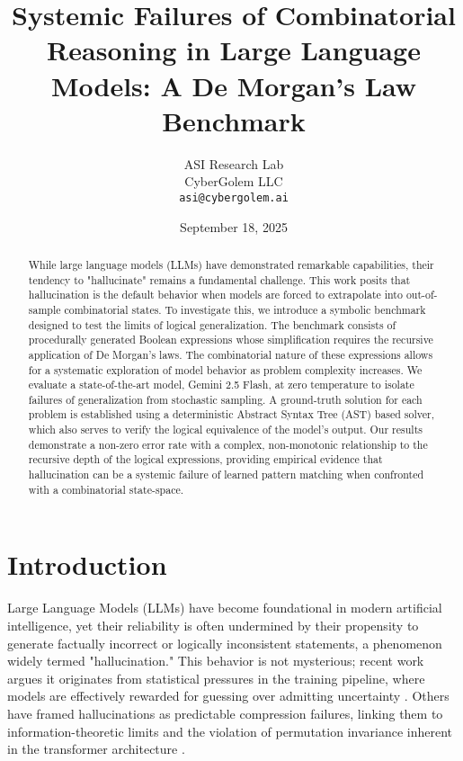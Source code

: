 \documentclass[11pt,a4paper]{article}
\title{Systemic Failures of Combinatorial Reasoning in Large Language Models: A De Morgan's Law Benchmark}
\author{ASI Research Lab\\
        CyberGolem LLC\\
        \texttt{asi@cybergolem.ai}}
\date{September 18, 2025}
\begin{document}
\maketitle

\begin{abstract}
While large language models (LLMs) have demonstrated remarkable capabilities, their tendency to "hallucinate" remains a fundamental challenge. This work posits that hallucination is the default behavior when models are forced to extrapolate into out-of-sample combinatorial states. To investigate this, we introduce a symbolic benchmark designed to test the limits of logical generalization. The benchmark consists of procedurally generated Boolean expressions whose simplification requires the recursive application of De Morgan's laws. The combinatorial nature of these expressions allows for a systematic exploration of model behavior as problem complexity increases. We evaluate a state-of-the-art model, Gemini 2.5 Flash, at zero temperature to isolate failures of generalization from stochastic sampling. A ground-truth solution for each problem is established using a deterministic Abstract Syntax Tree (AST) based solver, which also serves to verify the logical equivalence of the model's output. Our results demonstrate a non-zero error rate with a complex, non-monotonic relationship to the recursive depth of the logical expressions, providing empirical evidence that hallucination can be a systemic failure of learned pattern matching when confronted with a combinatorial state-space.
\end{abstract}

\section{Introduction}
Large Language Models (LLMs) have become foundational in modern artificial intelligence, yet their reliability is often undermined by their propensity to generate factually incorrect or logically inconsistent statements, a phenomenon widely termed "hallucination." This behavior is not mysterious; recent work argues it originates from statistical pressures in the training pipeline, where models are effectively rewarded for guessing over admitting uncertainty \citep{kalai2025why}. Others have framed hallucinations as predictable compression failures, linking them to information-theoretic limits and the violation of permutation invariance inherent in the transformer architecture \citep{chlon2025predictable}.
\end{document}
